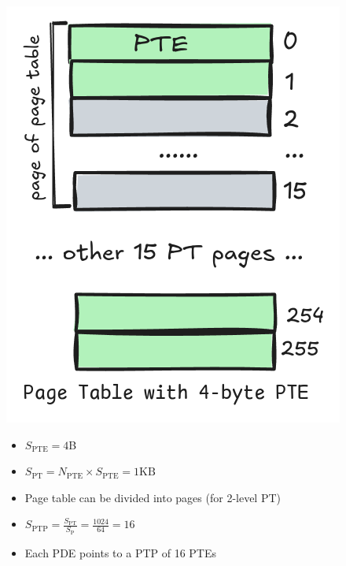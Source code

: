 \begin{minipage}{0.45\linewidth}
  \includegraphics[width=\linewidth]{imgs/pte_4byte}
  \flushleft
  \begin{itemize}
  \item $S_{\text{PTE}} =4$B
  \item $S_{\text{PT}} = N_{\text{PTE}} \times S_{\text{PTE}} = 1\text{KB} $
  \item Page table can be divided into pages (for 2-level PT)
  \item[] $S_{\text{PTP}} = \frac{S_{\text{PT}}}{S_{\text{P}}} = \frac{1024}{64} = 16$
  \item Each PDE points to a PTP of 16 PTEs
  \end{itemize}
\end{minipage}
